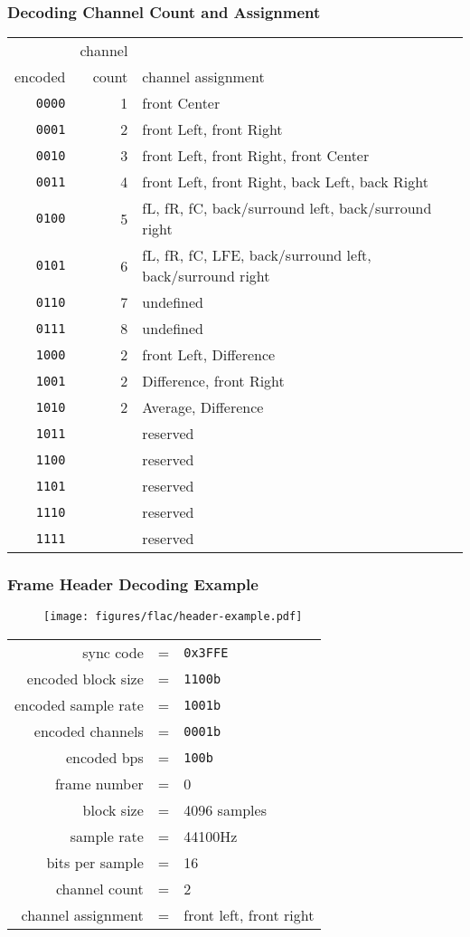 \subsubsection{Decoding Channel Count and Assignment}
{
\begin{tabular}{rrl}
& channel & \\
encoded & count & channel assignment \\
\hline
\texttt{0000} & 1 & front Center \\
\texttt{0001} & 2 & front Left, front Right \\
\texttt{0010} & 3 & front Left, front Right, front Center \\
\texttt{0011} & 4 & front Left, front Right, back Left, back Right \\
\texttt{0100} & 5 & fL, fR, fC, back/surround left, back/surround right \\
\texttt{0101} & 6 & fL, fR, fC, LFE, back/surround left, back/surround right \\
\texttt{0110} & 7 & undefined \\
\texttt{0111} & 8 & undefined \\
\texttt{1000} & 2 & front Left, Difference \\
\texttt{1001} & 2 & Difference, front Right \\
\texttt{1010} & 2 & Average, Difference \\
\texttt{1011} & & reserved \\
\texttt{1100} & & reserved \\
\texttt{1101} & & reserved \\
\texttt{1110} & & reserved \\
\texttt{1111} & & reserved \\
\end{tabular}
}

\subsubsection{Frame Header Decoding Example}
\begin{figure}[h]
\texttt{[image: figures/flac/header-example.pdf]}
\end{figure}
{
\begin{tabular}{rcl}
\textsf{sync code} & = & \texttt{0x3FFE} \\
\textsf{encoded block size} & = & \texttt{1100b} \\
\textsf{encoded sample rate} & = & \texttt{1001b} \\
\textsf{encoded channels} & = & \texttt{0001b} \\
\textsf{encoded bps} & = & \texttt{100b} \\
\textsf{frame number} & = & 0 \\
\textsf{block size} & = & 4096 samples \\
\textsf{sample rate} & = & 44100Hz \\
\textsf{bits per sample} & = & 16 \\
\textsf{channel count} & = & 2 \\
\textsf{channel assignment} & = & front left, front right
\end{tabular}
}
